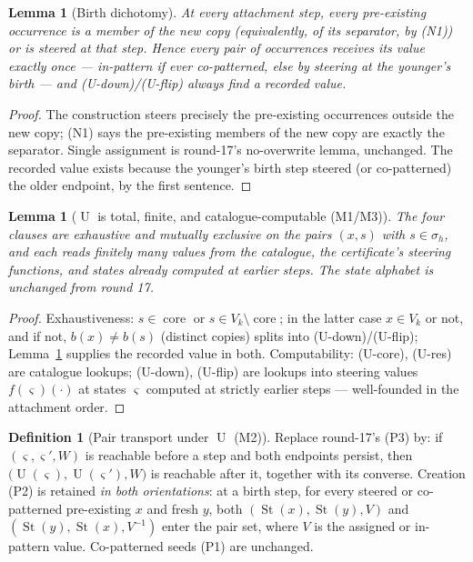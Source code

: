 \documentclass[11pt]{article}
\newtheorem{lemma}[theorem]{Lemma}
\theoremstyle{definition}
\newtheorem{definition}[theorem]{Definition}
\newcommand{\St}{\operatorname{St}}
\newcommand{\core}{\operatorname{core}}
\newcommand{\U}{\operatorname{U}}
\begin{document}
\begin{lemma}[Birth dichotomy]\label{lem:dichotomy}
At every attachment step, every pre-existing occurrence is a member of
the new copy (equivalently, of its separator, by (N1)) or is steered at
that step.  Hence every pair of occurrences receives its value exactly
once --- in-pattern if ever co-patterned, else by steering at the
younger's birth --- and (U-down)/(U-flip) always find a recorded value.
\end{lemma}

\begin{proof}
The construction steers precisely the pre-existing occurrences outside
the new copy; (N1) says the pre-existing members of the new copy are
exactly the separator.  Single assignment is round-17's no-overwrite
lemma, unchanged.  The recorded value exists because the younger's
birth step steered (or co-patterned) the older endpoint, by the first
sentence.
\end{proof}

\begin{lemma}[$\U$ is total, finite, and catalogue-computable
(M1/M3)]\label{lem:total}
The four clauses are exhaustive and mutually exclusive on the pairs
$(x,s)$ with $s\in\sigma_h$, and each reads finitely many values from
the catalogue, the certificate's steering functions, and states already
computed at earlier steps.  The state alphabet is unchanged from round
17.
\end{lemma}

\begin{proof}
Exhaustiveness: $s\in\core$ or $s\in V_k\setminus\core$; in the latter
case $x\in V_k$ or not, and if not, $b(x)\neq b(s)$ (distinct copies)
splits into (U-down)/(U-flip); Lemma~\ref{lem:dichotomy} supplies the
recorded value in both.  Computability: (U-core), (U-res) are catalogue
lookups; (U-down), (U-flip) are lookups into steering values
$f(\varsigma)(\cdot)$ at states $\varsigma$ computed at strictly
earlier steps --- well-founded in the attachment order.
\end{proof}

\begin{definition}[Pair transport under $\U$ (M2)]\label{def:P3}
Replace round-17's (P3) by: if $(\varsigma,\varsigma',W)$ is reachable
before a step and both endpoints persist, then
$\bigl(\U(\varsigma),\U(\varsigma'),W\bigr)$ is reachable after it,
together with its converse.  Creation (P2) is retained \emph{in both
orientations}: at a birth step, for every steered or co-patterned
pre-existing $x$ and fresh $y$, both $(\St(x),\St(y),V)$ and
$(\St(y),\St(x),V^{-1})$ enter the pair set, where $V$ is the assigned
or in-pattern value.  Co-patterned seeds (P1) are unchanged.
\end{definition}
\end{document}

